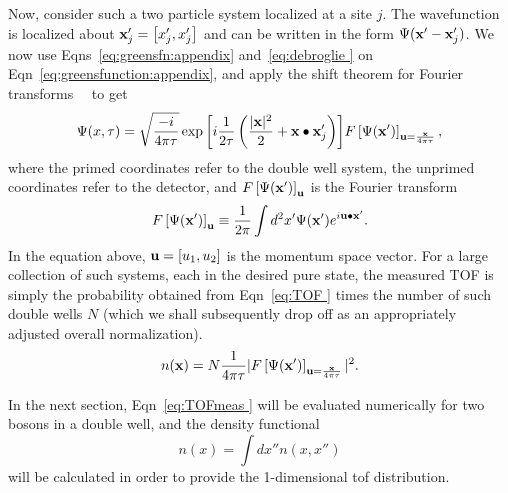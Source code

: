 \documentclass{article}
\begin{document}
Now, consider such a two particle system localized at a site $j$. The wavefunction is localized about ${\bf x}'_j = \left[ x'_j, x'_j \right]$ and can be written in the form $\Psi({\bf x}'-{\bf x}'_j)$. We now use Eqns~\ref{eq:greensfn:appendix} and~\ref{eq:debroglie } on Eqn~\ref{eq:greensfunction:appendix}, and apply the shift theorem for Fourier transforms~\cite{goodman}~\cite{Grondalski:etal} to get
\begin{equation}
\Psi(x,\tau) = \sqrt{\frac{-i}{4\pi\tau}}\exp{\left[ i\frac{1}{2\tau}\left( \frac{|{\bf x}|^2}{2} + {\bf x}\bullet {\bf x}'_j\right)\right]} F\left[ \Psi({\bf x}')\right]_{{\bf u}=\frac{{\bf x}}{4\pi\tau}},
\label{eq:TOF }
\end{equation}
where the primed coordinates refer to the double well system, the unprimed coordinates refer to the detector, and $ F\left[ \Psi({\bf x}')\right]_{\bf u}$ is the Fourier transform
\begin{equation}
F\left[ \Psi({\bf x}')\right]_{\bf u} \equiv \frac{1}{2 \pi} \int d^2x' \Psi({\bf x}') e^{i{\bf u}\bullet{\bf x}'}.
\end{equation}
In the equation above,  ${\bf u} = \left[ u_1, u_2 \right]$ is the momentum space vector. For a large collection of such systems, each in the desired pure state, the measured TOF is simply the probability obtained from Eqn~\ref{eq:TOF } times the number of such double wells $N$ (which we shall subsequently drop off as an appropriately adjusted overall normalization).
\begin{equation}
n({\bf x})= N \frac{1}{4\pi\tau} | F\left[ \Psi({\bf x}') \right]_{{\bf u}=\frac{{\bf x}}{4\pi\tau}} |^2.
\label{eq:TOFmeas }
\end{equation}

In the next section, Eqn~\ref{eq:TOFmeas } will be evaluated numerically for two bosons in a double well, and the density functional 
\begin{equation}
n(x) = \int dx'' n(x,x'')
\end{equation}
will be calculated in order to provide the 1-dimensional tof distribution.
\end{document}
